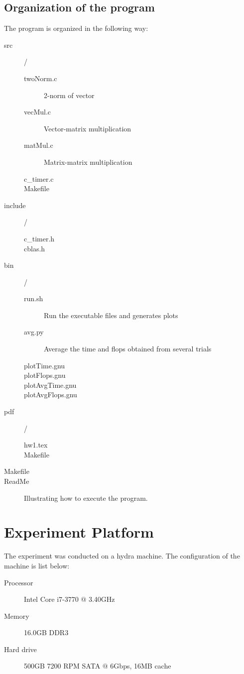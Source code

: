 \documentclass{article}
\begin{document}
\subsection{Organization of the program}
The program is organized in the following way:
\begin{description}
    \item[src]/
        \begin{description}
            \item[twoNorm.c] 2-norm of vector
            \item[vecMul.c] Vector-matrix multiplication
            \item[matMul.c] Matrix-matrix multiplication
            \item[c\_timer.c]
            \item[Makefile] 
        \end{description}
    \item[include]/
        \begin{description}
            \item[c\_timer.h]
            \item[cblas.h] 
        \end{description}
    \item[bin]/
        \begin{description}
            \item[run.sh] Run the executable files and generates plots
            \item[avg.py] Average the time and flops obtained from several trials
            \item[plotTime.gnu]
            \item[plotFlops.gnu]
            \item[plotAvgTime.gnu]
            \item[plotAvgFlops.gnu]
        \end{description}
    \item[pdf]/
        \begin{description}
            \item[hw1.tex]
            \item[Makefile]
        \end{description}
    \item[Makefile]
    \item[ReadMe] Illustrating how to execute the program.
\end{description}

\newpage
\section{Experiment Platform}
The experiment was conducted on a hydra machine. The configuration of the machine is list below:
\begin{description}
\item[Processor] Intel Core i7-3770 $@$ 3.40GHz
\item[Memory] 16.0GB DDR3
\item[Hard drive] 500GB 7200 RPM SATA $@$ 6Gbps, 16MB cache
\end{description}
\end{document}
